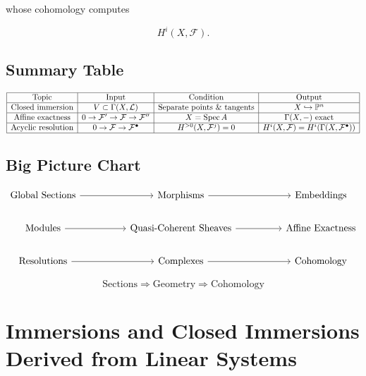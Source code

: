 \documentclass[12pt,a4paper]{article}
\theoremstyle{notespace}
\begin{document}
whose cohomology computes

\[
H^i(X,\mathcal F).
\]

\subsection{Summary Table}

\[
\begin{array}{|c|c|c|c|}
	\hline
	\text{Topic}
	&
	\text{Input}
	&
	\text{Condition}
	&
	\text{Output}
	\\
	\hline
	
	\text{Closed immersion}
	&
	V\subset \Gamma(X,\mathcal L)
	&
	\text{Separate points \& tangents}
	&
	X\hookrightarrow \mathbb P^n
	\\
	\hline
	
	\text{Affine exactness}
	&
	0\to \mathcal F'\to \mathcal F\to \mathcal F''
	&
	X=\operatorname{Spec}A
	&
	\Gamma(X,-)\text{ exact}
	\\
	\hline
	
	\text{Acyclic resolution}
	&
	0\to \mathcal F\to \mathcal F^\bullet
	&
	H^{>0}(X,\mathcal F^j)=0
	&
	H^i(X,\mathcal F)
	=
	H^i(\Gamma(X,\mathcal F^\bullet))
	\\
	\hline
	
\end{array}
\]

\subsection{Big Picture Chart}

\[
\begin{tikzcd}[column sep=huge]
	\text{Global Sections}
	\arrow[r]
	&
	\text{Morphisms}
	\arrow[r]
	&
	\text{Embeddings}
	\\
	\text{Modules}
	\arrow[r]
	&
	\text{Quasi-Coherent Sheaves}
	\arrow[r]
	&
	\text{Affine Exactness}
	\\
	\text{Resolutions}
	\arrow[r]
	&
	\text{Complexes}
	\arrow[r]
	&
	\text{Cohomology}
\end{tikzcd}
\]

\[
\boxed{
	\text{Sections}
	\Longrightarrow
	\text{Geometry}
	\Longrightarrow
	\text{Cohomology}
}
\]

\section{Immersions and Closed Immersions Derived from Linear Systems}
\end{document}
